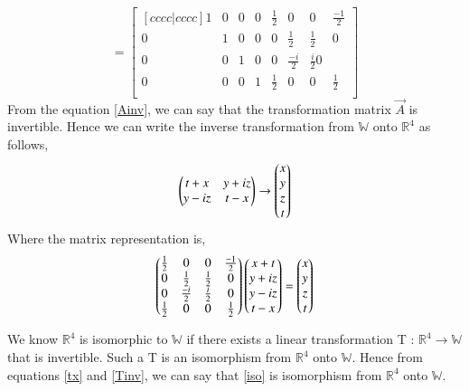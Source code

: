 \documentclass[journal,12pt,twocolumn]{IEEEtran}
\numberwithin{table}{section}
\begin{document}
\begin{enumerate}
\begin{equation}
[\vec{I}|\vec{A}^{-1}]=
 \begin{bmatrix}[cccc|cccc]
 1&0&0&0&\frac{1}{2}&0&0&\frac{-1}{2}\\
 0&1&0&0&0&\frac{1}{2}&\frac{1}{2}&0\\
 0&0&1&0&0&\frac{-i}{2}&\frac{i}{2}0\\
 0&0&0&1&\frac{1}{2}&0&0&\frac{1}{2}\\
\end{bmatrix} 
\end{equation}
From the equation \eqref{Ainv}, we can say that the transformation matrix $\vec{A}$ is invertible.
Hence we can write the inverse transformation from $\mathbb{W}$ onto $\mathbb{R}^4$ as follows,
\begin{align}
\begin{pmatrix}t+x&y+iz\\y-iz&t-x\end{pmatrix} \rightarrow \begin{pmatrix}x\\y\\z\\t\end{pmatrix}
\end{align}
Where the matrix representation is,
\begin{align}\label{Tinv}
\begin{pmatrix}\frac{1}{2}&0&0&\frac{-1}{2}\\0&\frac{1}{2}&\frac{1}{2}&0\\0&\frac{-i}{2}&\frac{i}{2}&0\\\frac{1}{2}&0&0&\frac{1}{2}\end{pmatrix}
\begin{pmatrix}x+t\\y+iz\\y-iz\\t-x\end{pmatrix}=\begin{pmatrix}x\\y\\z\\t\end{pmatrix}
\end{align}
\end{enumerate}
We know $\mathbb{R}^4$ is isomorphic to $\mathbb{W}$ if there exists
a linear transformation T : $\mathbb{R}^4 \rightarrow \mathbb{W}$ that is invertible. Such a T is
an isomorphism from $\mathbb{R}^4$ onto $\mathbb{W}$.
Hence from equations \eqref{tx} and \eqref{Tinv}, we can say that \eqref{iso} is isomorphism  from $\mathbb{R}^4$ onto $\mathbb{W}$.
\end{document}
